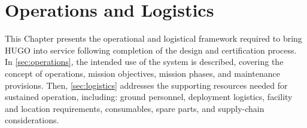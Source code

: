 \chapter{Operations and Logistics}
\label{ch:operations_logistics}


This Chapter presents the operational and logistical framework required to bring HUGO into service following completion of the design and certification process. In \autoref{sec:operations}, the intended use of the system is described, covering the concept of operations, mission objectives, mission phases, and maintenance provisions. Then, \autoref{sec:logistics} addresses the supporting resources needed for sustained operation, including: ground personnel, deployment logistics, facility and location requirements, consumables, spare parts, and supply-chain considerations.

